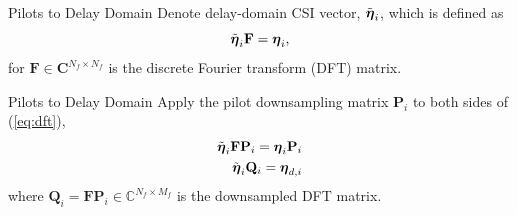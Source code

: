 \documentclass{beamer}
\begin{document}

  \begin{frame}{Pilots to Delay Domain}
    Denote delay-domain CSI vector, $\tilde{\boldsymbol{\eta}}_i$, which is defined as
    \begin{equation}
      \tilde{\boldsymbol{\eta}}_{i}\mathbf{F} = \boldsymbol{\eta}_i, \label{eq:dft}
    \end{equation}
    for $\mathbf{F} \in \mathbf{C}^{N_f \times N_f}$ is the discrete Fourier transform (DFT) matrix.
  \end{frame}

  \begin{frame}{Pilots to Delay Domain}
    Apply the pilot downsampling matrix $\mathbf{P}_i$ to both sides of (\ref{eq:dft}),
    \begin{align}
      \tilde{\boldsymbol{\eta}}_{i}\mathbf{F}\mathbf{P}_i = \boldsymbol{\eta}_i\mathbf{P}_i \nonumber \\
      \tilde{\boldsymbol{\eta}}_{i}\mathbf{Q}_i = \boldsymbol{\eta}_{d,i} \label{eq:qmat}
    \end{align}
    where $\mathbf{Q}_i=\mathbf{F}\mathbf{P}_i\in\mathbb{C}^{N_f\times M_f}$ is the downsampled DFT matrix.
  \end{frame}
\end{document}
